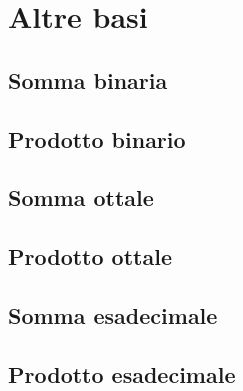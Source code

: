 \chapter{Altre basi}
\section{Somma binaria}
\begin{center}
\end{center}
\section{Prodotto binario}
\begin{center}
\end{center}
\section{Somma ottale}
\begin{center}
\end{center}
\section{Prodotto ottale}
\begin{center}
\end{center}
\section{Somma esadecimale}
\begin{center}
\end{center}
\section{Prodotto esadecimale}
\begin{center}
\end{center}